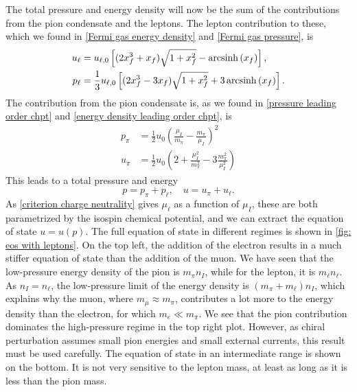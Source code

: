 The total pressure and energy density will now be the sum of the contributions from the pion condensate and the leptons.
The lepton contribution to these, which we found in \autoref{Fermi gas energy density} and \autoref{Fermi gas pressure}, is
%
\begin{align}
    u_\ell 
    &= u_{\ell,0} 
    \left[(2x_f^3 + x_f) \sqrt{1 + x_f^2} - \operatorname{arcsinh}\left(x_f\right)\right], \\
    p_\ell
    &=\frac{1}{3} u_{\ell,0}
    \left[(2x_f^3 - 3x_f) \sqrt{1 + x_f^2} + 3\operatorname{arcsinh}\left(x_f\right)\right].
\end{align}
%
The contribution from the pion condensate is, as we found in \autoref{pressure leading order chpt} and \autoref{energy density leading order chpt}, is
%
\begin{align}
    p_\pi &= \frac{1}{2} u_0 \left( \frac{\mu_I}{m_\pi} - \frac{m_\pi}{\mu_I}\right)^2 \\
    u_\pi &= \frac{1}{2} u_0 \left( 2 + \frac{\mu_I^2}{m_\pi^2} - 3 \frac{m_\pi^2}{\mu_I^2}  \right)
\end{align}
%
This leads to a total pressure and energy
%
\begin{equation}
    p = p_\pi + p_\ell, \quad u = u_\pi + u_\ell.
\end{equation}
%
As \autoref{criterion charge neutrality} gives $\mu_\ell$ as a function of $\mu_I$, these are both parametrized by the isospin chemical potential, and we can extract the equation of state $u = u(p)$.
The full equation of state in different regimes is shown in \autoref{fig: eos with leptons}.
On the top left, the addition of the electron results in a much stiffer equation of state than the addition of the muon.
We have seen that the low-pressure energy density of the pion is $m_\pi n_I $, while for the lepton, it is $m_\ell n_\ell$.
As $n_I = n_\ell$, the low-pressure limit of the energy density is $(m_\pi + m_\ell)n_ I$, which explains why the muon, where $m_\mu \approx m_\pi$, contributes a lot more to the energy density than the electron, for which $m_e \ll m_\pi$.
We see that the pion contribution dominates the high-pressure regime in the top right plot.
However, as chiral perturbation assumes small pion energies and small external currents, this result must be used carefully.
The equation of state in an intermediate range is shown on the bottom.
It is not very sensitive to the lepton mass, at least as long as it is less than the pion mass.

